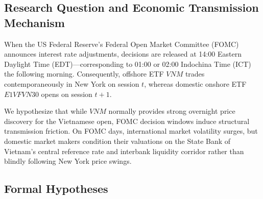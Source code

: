 \documentclass{article}
\begin{document}
\subsection{Research Question and Economic Transmission Mechanism}

When the US Federal Reserve's Federal Open Market Committee (FOMC) announces interest rate adjustments, decisions are released at 14:00 Eastern Daylight Time (EDT)—corresponding to 01:00 or 02:00 Indochina Time (ICT) the following morning. Consequently, offshore ETF $VNM$ trades contemporaneously in New York on session $t$, whereas domestic onshore ETF $E1VFVN30$ opens on session $t+1$. 

We hypothesize that while $VNM$ normally provides strong overnight price discovery for the Vietnamese open, FOMC decision windows induce structural transmission friction. On FOMC days, international market volatility surges, but domestic market makers condition their valuations on the State Bank of Vietnam's central reference rate and interbank liquidity corridor rather than blindly following New York price swings.

\subsection{Formal Hypotheses}
\end{document}
